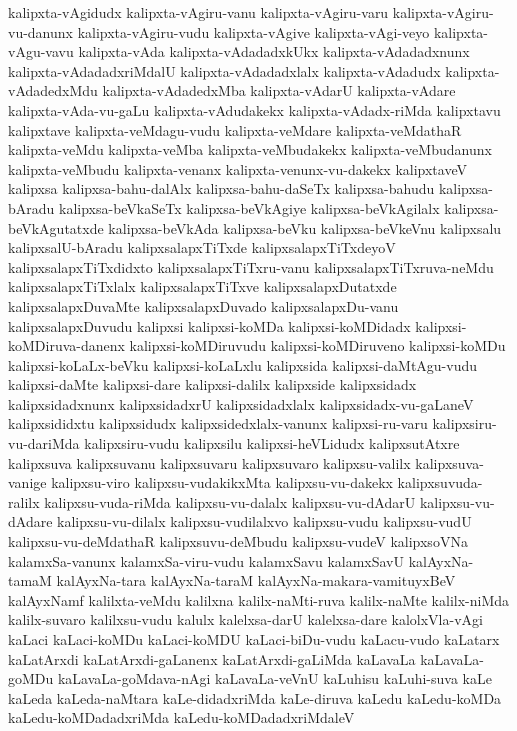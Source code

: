 {kalipxta-vAgidudx
kalipxta-vAgiru-vanu
kalipxta-vAgiru-varu
kalipxta-vAgiru-vu-danunx
kalipxta-vAgiru-vudu
kalipxta-vAgive
kalipxta-vAgi-veyo
kalipxta-vAgu-vavu
kalipxta-vAda
kalipxta-vAdadadxkUkx
kalipxta-vAdadadxnunx
kalipxta-vAdadadxriMdalU
kalipxta-vAdadadxlalx
kalipxta-vAdadudx
kalipxta-vAdadedxMdu
kalipxta-vAdadedxMba
kalipxta-vAdarU
kalipxta-vAdare
kalipxta-vAda-vu-gaLu
kalipxta-vAdudakekx
kalipxta-vAdadx-riMda
kalipxtavu
kalipxtave
kalipxta-veMdagu-vudu
kalipxta-veMdare
kalipxta-veMdathaR
kalipxta-veMdu
kalipxta-veMba
kalipxta-veMbudakekx
kalipxta-veMbudanunx
kalipxta-veMbudu
kalipxta-venanx
kalipxta-venunx-vu-dakekx
kalipxtaveV
kalipxsa
kalipxsa-bahu-dalAlx
kalipxsa-bahu-daSeTx
kalipxsa-bahudu
kalipxsa-bAradu
kalipxsa-beVkaSeTx
kalipxsa-beVkAgiye
kalipxsa-beVkAgilalx
kalipxsa-beVkAgutatxde
kalipxsa-beVkAda
kalipxsa-beVku
kalipxsa-beVkeVnu
kalipxsalu
kalipxsalU-bAradu
kalipxsalapxTiTxde
kalipxsalapxTiTxdeyoV
kalipxsalapxTiTxdidxto
kalipxsalapxTiTxru-vanu
kalipxsalapxTiTxruva-neMdu
kalipxsalapxTiTxlalx
kalipxsalapxTiTxve
kalipxsalapxDutatxde
kalipxsalapxDuvaMte
kalipxsalapxDuvado
kalipxsalapxDu-vanu
kalipxsalapxDuvudu
kalipxsi
kalipxsi-koMDa
kalipxsi-koMDidadx
kalipxsi-koMDiruva-danenx
kalipxsi-koMDiruvudu
kalipxsi-koMDiruveno
kalipxsi-koMDu
kalipxsi-koLaLx-beVku
kalipxsi-koLaLxlu
kalipxsida
kalipxsi-daMtAgu-vudu
kalipxsi-daMte
kalipxsi-dare
kalipxsi-dalilx
kalipxside
kalipxsidadx
kalipxsidadxnunx
kalipxsidadxrU
kalipxsidadxlalx
kalipxsidadx-vu-gaLaneV
kalipxsididxtu
kalipxsidudx
kalipxsidedxlalx-vanunx
kalipxsi-ru-varu
kalipxsiru-vu-dariMda
kalipxsiru-vudu
kalipxsilu
kalipxsi-heVLidudx
kalipxsutAtxre
kalipxsuva
kalipxsuvanu
kalipxsuvaru
kalipxsuvaro
kalipxsu-valilx
kalipxsuva-vanige
kalipxsu-viro
kalipxsu-vudakikxMta
kalipxsu-vu-dakekx
kalipxsuvuda-ralilx
kalipxsu-vuda-riMda
kalipxsu-vu-dalalx
kalipxsu-vu-dAdarU
kalipxsu-vu-dAdare
kalipxsu-vu-dilalx
kalipxsu-vudilalxvo
kalipxsu-vudu
kalipxsu-vudU
kalipxsu-vu-deMdathaR
kalipxsuvu-deMbudu
kalipxsu-vudeV
kalipxsoVNa
kalamxSa-vanunx
kalamxSa-viru-vudu
kalamxSavu
kalamxSavU
kalAyxNa-tamaM
kalAyxNa-tara
kalAyxNa-taraM
kalAyxNa-makara-vamituyxBeV
kalAyxNamf
kalilxta-veMdu
kalilxna
kalilx-naMti-ruva
kalilx-naMte
kalilx-niMda
kalilx-suvaro
kalilxsu-vudu
kalulx
kalelxsa-darU
kalelxsa-dare
kalolxVla-vAgi
kaLaci
kaLaci-koMDu
kaLaci-koMDU
kaLaci-biDu-vudu
kaLacu-vudo
kaLatarx
kaLatArxdi
kaLatArxdi-gaLanenx
kaLatArxdi-gaLiMda
kaLavaLa
kaLavaLa-goMDu
kaLavaLa-goMdava-nAgi
kaLavaLa-veVnU
kaLuhisu
kaLuhi-suva
kaLe
kaLeda
kaLeda-naMtara
kaLe-didadxriMda
kaLe-diruva
kaLedu
kaLedu-koMDa
kaLedu-koMDadadxriMda
kaLedu-koMDadadxriMdaleV
}
